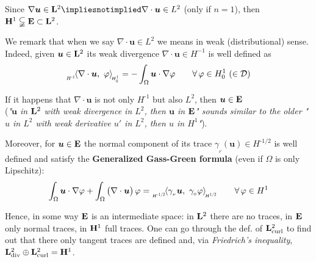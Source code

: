 \begin{itemize}
Since $\nabla\bm u\in \Lv^2 \impliesnotimplied \nabla\cdot\bm u\in L^2$ (only if $n=1$), then $\mathbf{H}^1 \subsetneqq \mathbf{E} \subset \mathbf{L}^2$. 

We remark that when we say $\nabla\cdot\bm u\in L^2$ we means in weak (distributional) sense. Indeed, given $\bm u\in\mathbf{L}^2$ its weak divergence $\nabla\cdot \bm u\in H^{-1}$ is well defined as
\begin{equation*}
\dualH{\nabla\cdot\bm u,\ \varphi}{-1}{1}{0}=-\int_\Omega \bm u\cdot \nabla \varphi\qquad \forall\, \varphi \in H^1_0\ (\in\Dc)
\end{equation*}

If it happens that $\nabla\cdot \bm u$ is not only $H^{\text{-}1}\!$ but also $L^2$, then $\bm u\in \mathbf{E}$ \\ (\emph{"$\bm u$ in $\mathbf{L}^2$ with weak divergence in $L^2$, then $\bm u$ in $\mathbf{E}$" sounds similar to the older "$u$ in $L^2$ with weak derivative $u'$ in $L^2$, then $u$ in $H^1$"}).

Moreover, for $\bm u\in\mathbf{E}$ the normal component of its trace $\gamma_{_\nu}(\bm u)\in H^{\text{-}1/2}$ is well defined and satisfy the \textbf{Generalized Gass-Green formula} (even if $\Omega$ is only Lipschitz):
\begin{equation}
\label{eq:GG}
\int_\Omega \bm u\cdot \nabla \varphi+\int_\Omega \big(\nabla\cdot\bm u\big)\, \varphi = \dualT{\gamma_{_\nu}\bm u,\ \gamma_{_0}\varphi}{-1/2}{1/2}\qquad \forall \,\varphi\in H^1
\end{equation}

Hence, in some way $\mathbf{E}$ is an intermediate space: in $\mathbf{L}^2$ there are no traces, in $\mathbf{E}$ only normal traces, in $\mathbf{H}^1$ full traces. One can go through the def. of $\mathbf{L}^2_{\text{curl}}$ to find out that there only tangent traces are defined and, via \emph{Friedrich's inequality}, $\mathbf{L}^2_{\text{div}}\oplus\mathbf{L}^2_{\text{curl}}=\mathbf{H}^1$.

\end{itemize}

